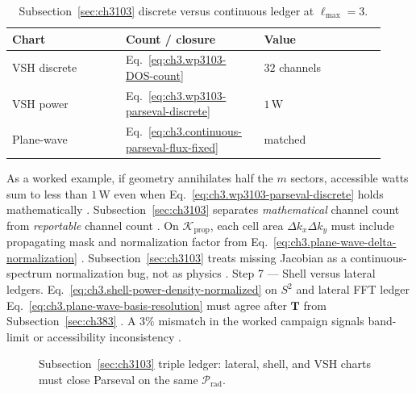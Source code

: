 \begin{table}[t]
\centering
\caption{Subsection~\ref{sec:ch3103} discrete versus continuous ledger at \(\ell_{\max}=3\).}
\label{tab:ch3.3103-ledger}
\small
\begin{tabular}{@{}p{0.28\linewidth}p{0.34\linewidth}p{0.30\linewidth}@{}}
\toprule
Chart & Count / closure & Value \\
\midrule
VSH discrete & Eq.~\eqref{eq:ch3.wp3103-DOS-count} & $32$ channels \\
VSH power & Eq.~\eqref{eq:ch3.wp3103-parseval-discrete} & $1\,\mathrm{W}$ \\
Plane-wave & Eq.~\eqref{eq:ch3.continuous-parseval-flux-fixed} & matched \\
\bottomrule
\end{tabular}
\end{table}
As a worked example, if geometry annihilates half the \(m\) sectors, accessible watts sum to less than \(1\,\mathrm{W}\) even when
Eq.~\eqref{eq:ch3.wp3103-parseval-discrete} holds mathematically \cite{harrington2001}. Subsection~\ref{sec:ch3103} separates
\emph{mathematical} channel count from \emph{reportable} channel count \cite{hansen1988}.
On \(\mathcal{K}_{\mathrm{prop}}\), each cell area \(\Delta k_{x}\Delta k_{y}\) must include propagating mask and normalization factor from
Eq.~\eqref{eq:ch3.plane-wave-delta-normalization} \cite{stratton1941}. Subsection~\ref{sec:ch3103} treats missing
Jacobian as a continuous-spectrum normalization bug, not as physics \cite{hansen1988}.
Step 7 --- Shell versus lateral ledgers. Eq.~\eqref{eq:ch3.shell-power-density-normalized} on \(S^{2}\) and lateral FFT ledger Eq.~\eqref{eq:ch3.plane-wave-basis-resolution} must
agree after \(\mathbf{T}\) from Subsection~\ref{sec:ch383} \cite{hansen1988}. A \(3\%\) mismatch in the worked campaign signals
band-limit or accessibility inconsistency \cite{harrington2001}.
\begin{figure}[t]
\centering
{}
\caption{Subsection~\ref{sec:ch3103} triple ledger: lateral, shell, and VSH charts must close Parseval on the same $\mathcal{P}_{\mathrm{rad}}$.}
\label{fig:ch3.3103-triple-ledger}
\end{figure}
